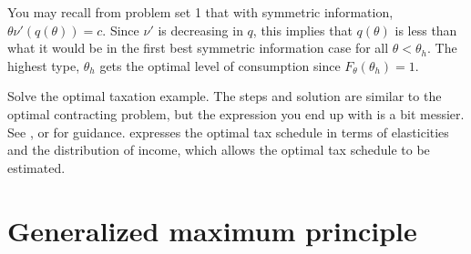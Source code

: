 You may recall from problem set 1 that with symmetric information,
$\theta \nu'(q(\theta)) = c$. Since $\nu'$ is decreasing in $q$, this
implies that $q(\theta)$ is less than what it would be in the first
best symmetric information case for all $\theta < \theta_h$. The
highest type, $\theta_h$ gets the optimal level of consumption since
$F_\theta(\theta_h) = 1$.

\begin{exercise}[difficult]
  Solve the optimal taxation example. The steps and solution are
  similar to the optimal contracting problem, but the expression you
  end up with is a bit messier. See \cite{mirrlees1971}, or
  \cite{diamond1998} for guidance. \cite{saez2001} expresses the
  optimal tax schedule in terms of elasticities and the distribution
  of income, which allows the optimal tax schedule to be estimated. 
\end{exercise}

\appendix

\section{Generalized maximum principle}

